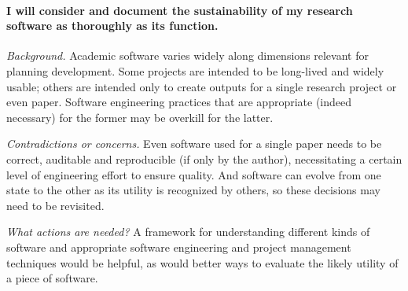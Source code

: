 \paragraph{I will consider and document the sustainability of my research software as thoroughly as its function.}



\emph{Background.} Academic software varies widely along dimensions relevant for planning development. Some projects are intended to be long-lived and widely usable; others are intended only to create outputs for a single research project or even paper. Software engineering practices that are appropriate (indeed necessary) for the former may be overkill for the latter. 

\emph{Contradictions or concerns.} Even software used for a single paper needs to be correct, auditable and reproducible (if only by the author), necessitating a certain level of engineering effort to ensure quality. And software can evolve from one state to the other as its utility is recognized by others, so these decisions may need to be revisited. 

\emph{What actions are needed?}
A framework for understanding different kinds of software and appropriate software engineering and project management techniques would be helpful, as would better ways to evaluate the likely utility of a piece of software. 

